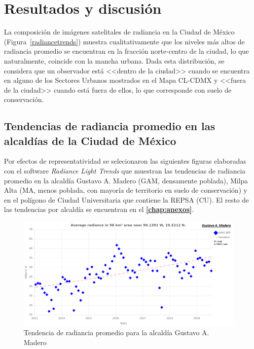 \chapter{Resultados y discusión}

La composición de imágenes satelitales de radiancia en la Ciudad de México (Figura~\ref{radiancetrends}) muestra cualitativamente que los niveles más altos de radiancia promedio se encuentran en la fracción norte-centro de la ciudad, lo que naturalmente, coincide con la mancha urbana. Dada esta distribución, se considera que un observador está <<dentro de la ciudad>> cuando se encuentra en alguno de los Sectores Urbanos mostrados en el Mapa CL-CDMX y <<fuera de la ciudad>> cuando está fuera de ellos, lo que corresponde con suelo de conservación. 

\section{Tendencias de radiancia promedio en las alcaldías de la Ciudad de México}

Por efectos de representatividad se selecionaron las siguientes figuras elaboradas con el software \textit{Radiance Light Trends} que muestran las tendencias de radiancia promedio en la alcaldía Gustavo A. Madero (GAM, densamente poblada), Milpa Alta (MA, menos poblada, con mayoría de territorio en suelo de conservación) y en el polígono de Ciudad Universitaria que contiene la REPSA (CU). El resto de las tendencias por alcaldía se encuentran en el \textbf{\autoref{chap:anexos}}.

\begin{figure}[htb]
  \centering
    \includegraphics[width=1\textwidth]{GAM}
  \caption{Tendencia de radiancia promedio para la alcaldía Gustavo A. Madero}
  \label{radiancetrendsgam}
\end{figure}


